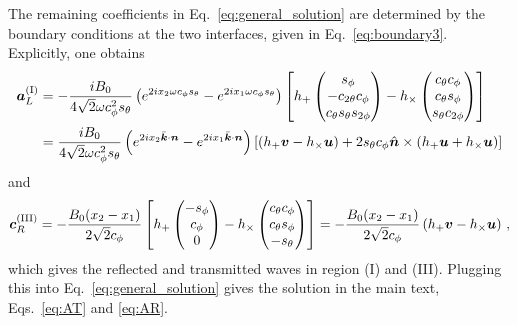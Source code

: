 \documentclass[a4paper,11pt]{article}
\begin{document}
The remaining coefficients in Eq.~\eqref{eq:general_solution} are determined by the boundary conditions at the two interfaces, given in Eq.~\eqref{eq:boundary3}.
%
Explicitly, one obtains
\begin{align}
    \bm{a}_{L}^{\rm (I)} & = - \frac{i B_{0}}{4 \sqrt{2} \omega c_{\phi}^{2} s_{\theta} }  
 \left( e^{2i x_2 \omega c_{\phi} s_{\theta} } - e^{2i x_1 \omega c_{\phi} s_{\theta} } \right) \left[ h_{+} \begin{pmatrix}
          s_{\phi} \\
          -c_{2\theta} c_{\phi} \\
          c_{\theta} s_{\theta} s_{2 \phi}
      \end{pmatrix} - h_{\times}
      \begin{pmatrix}
         c_{\theta} c_{\phi} \\
         c_{\theta} s_{\phi} \\
         s_{\theta} c_{2\phi}
      \end{pmatrix}
      \right] 
      \,  \nonumber  \\
     & = \frac{i B_{0}}{4 \sqrt{2} \omega c_{\phi}^{2} s_{\theta} }  
     \left( e^{2i x_2 \bar{\bm k}\cdot {\bm n}} -  e^{2i x_1 \bar{\bm k}\cdot {\bm n}}  \right) \left[  \left(  h_{+} \bm{v} - h_{\times} \bm{u}  \right)  + 2 s_{\theta} c_{\phi} \hat{\bm{n}} \times \left(  h_{+} \bm{u} + h_{\times} \bm{u}  \right)  \right] 
\end{align}
%
and
%
\begin{equation}
    \begin{aligned}
    \bm{c}_{R}^{\rm (III)} = 
    - \frac{B_{0} (x_{2} - x_{1})}{2 \sqrt{2} c_{\phi}}
    \left[ h_{+} \begin{pmatrix}
         -s_{\phi} \\ c_{\phi} \\ 0 
    \end{pmatrix} - h_{\times} \begin{pmatrix}
        c_{\theta} c_{\phi} \\
        c_{\theta} s_{\phi} \\
        - s_{\theta}
    \end{pmatrix} \right]  =  - \frac{B_{0} (x_{2} - x_{1})}{2 \sqrt{2} c_{\phi}}
     \left(  h_{+} \bm{v} - h_{\times} \bm{u}  \right) \,, 
    \end{aligned}   
\end{equation}
%
which gives the reflected and transmitted waves in region (I) and (III). Plugging this into Eq.~\eqref{eq:general_solution} gives the solution in the main text, Eqs.~\eqref{eq:AT} and \eqref{eq:AR}.
\end{document}
